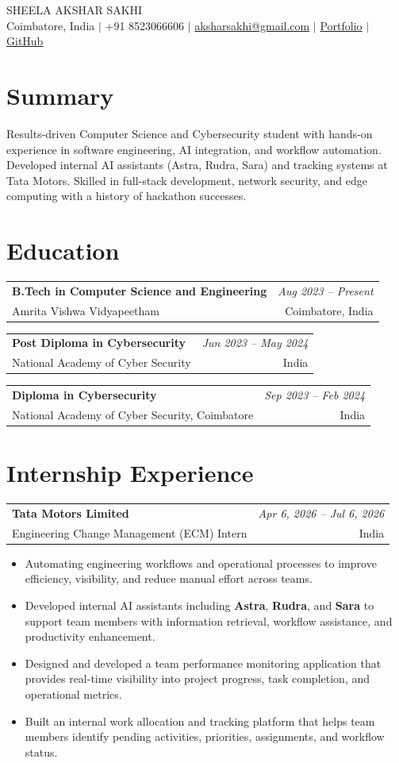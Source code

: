 \documentclass[letterpaper,10pt]{article}
\makeatletter
\newcommand{\resumeItem}[1]{
  \item \small{#1}
}
\newcommand{\resumeSubheading}[4]{
\vspace{2pt}
\begin{tabular*}{\textwidth}{l@{\extracolsep{\fill}}r}
\textbf{#1} & \textit{#2} \\
{\small #3} & {\small #4} \\
\end{tabular*}
\vspace{2pt}
}
\makeatother
\begin{document}
\begin{center}
    {\Huge \scshape SHEELA AKSHAR SAKHI} \\[6pt]
    Coimbatore, India $|$
    +91 8523066606 $|$
    \href{mailto:aksharsakhi@gmail.com}{aksharsakhi@gmail.com} $|$
    \href{https://aksharsakhi.github.io/}{Portfolio} $|$
    \href{https://github.com/aksharsakhi}{GitHub}
\end{center}

\vspace{-8pt}

\section{Summary}

\small{
Results-driven Computer Science and Cybersecurity student with hands-on experience in software engineering, AI integration, and workflow automation. Developed internal AI assistants (Astra, Rudra, Sara) and tracking systems at Tata Motors. Skilled in full-stack development, network security, and edge computing with a history of hackathon successes.
}

\section{Education}

\resumeSubheading
{B.Tech in Computer Science and Engineering}{Aug 2023 -- Present}
{Amrita Vishwa Vidyapeetham}{Coimbatore, India}

\resumeSubheading
{Post Diploma in Cybersecurity}{Jun 2023 -- May 2024}
{National Academy of Cyber Security}{India}

\resumeSubheading
{Diploma in Cybersecurity}{Sep 2023 -- Feb 2024}
{National Academy of Cyber Security, Coimbatore}{India}

\section{Internship Experience}

\resumeSubheading
{Tata Motors Limited}{Apr 6, 2026 -- Jul 6, 2026}
{Engineering Change Management (ECM) Intern}{India}
\begin{itemize}

\resumeItem{Automating engineering workflows and operational processes to improve efficiency, visibility, and reduce manual effort across teams.}

\resumeItem{Developed internal AI assistants including \textbf{Astra}, \textbf{Rudra}, and \textbf{Sara} to support team members with information retrieval, workflow assistance, and productivity enhancement.}

\resumeItem{Designed and developed a team performance monitoring application that provides real-time visibility into project progress, task completion, and operational metrics.}

\resumeItem{Built an internal work allocation and tracking platform that helps team members identify pending activities, priorities, assignments, and workflow status.}

\end{itemize}
\end{document}
